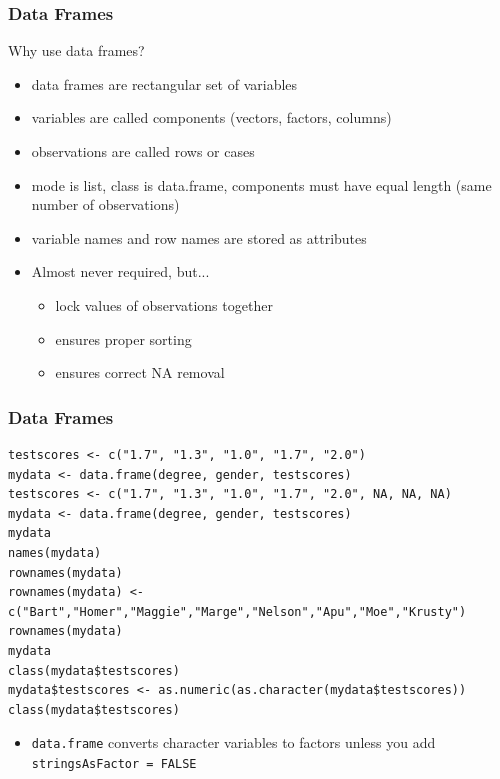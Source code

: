 \documentclass[xcolor={svgnames},10pt,
handout
]{beamer}
\begin{document}
\begin{frame}\frametitle{Data Frames}
Why use data frames?
\begin{itemize}
\item data frames are rectangular set of variables
\item variables are called components (vectors, factors, columns)
\item observations are called rows or cases
\item mode is list, class is data.frame, components must have equal length (same number of observations)
\item variable names and row names are stored as attributes
\item Almost never required, but...
\begin{itemize}
\item lock values of observations together
\item ensures proper sorting
\item ensures correct NA removal
\end{itemize}
\end{itemize}
\end{frame}

\begin{frame}[fragile]\frametitle{Data Frames}\footnotesize
\begin{lstlisting}
testscores <- c("1.7", "1.3", "1.0", "1.7", "2.0")
mydata <- data.frame(degree, gender, testscores)
testscores <- c("1.7", "1.3", "1.0", "1.7", "2.0", NA, NA, NA)
mydata <- data.frame(degree, gender, testscores)
mydata
names(mydata)
rownames(mydata)
rownames(mydata) <- c("Bart","Homer","Maggie","Marge","Nelson","Apu","Moe","Krusty")
rownames(mydata)
mydata
class(mydata$testscores)
mydata$testscores <- as.numeric(as.character(mydata$testscores))
class(mydata$testscores)
\end{lstlisting}
\begin{itemize}
\item \lstinline|data.frame| converts character variables to factors unless you add \lstinline|stringsAsFactor = FALSE|
\end{itemize}
\end{frame}
\end{document}
